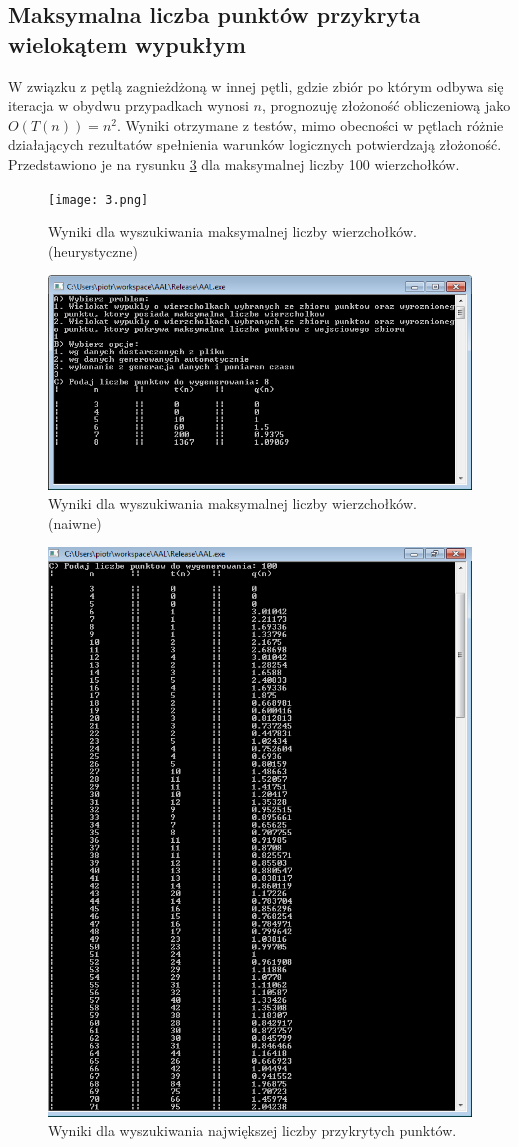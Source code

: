 \documentclass[11pt,a4paper]{article}
\begin{document}
\subsection{Maksymalna liczba punktów przykryta wielokątem wypukłym}
W związku z pętlą zagnieżdżoną w innej pętli, gdzie zbiór po którym odbywa się iteracja w obydwu przypadkach wynosi $n$, prognozuję złożoność obliczeniową jako $O(T(n))=n^2$. Wyniki otrzymane z testów, mimo obecności w pętlach różnie działających rezultatów spełnienia warunków logicznych potwierdzają złożoność. Przedstawiono je na rysunku \ref{img_2} dla maksymalnej liczby 100 wierzchołków.
\begin{figure}
\texttt{[image: 3.png]}
\caption{Wyniki dla wyszukiwania maksymalnej liczby wierzchołków. (heurystyczne)}
\label{img_3}
\end{figure}
\begin{figure}
\includegraphics[width=\textwidth]{1.png}
\caption{Wyniki dla wyszukiwania maksymalnej liczby wierzchołków. (naiwne)}
\label{img_1}
\end{figure}
\begin{figure}
\includegraphics[width=\textwidth]{2.png}
\caption{Wyniki dla wyszukiwania największej liczby przykrytych punktów.}
\label{img_2}
\end{figure}
\end{document}
